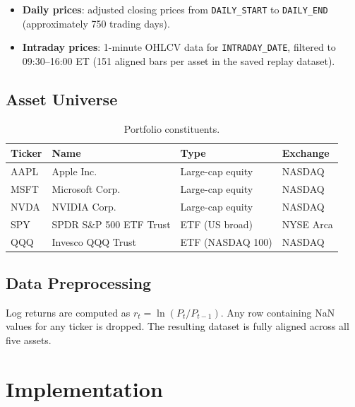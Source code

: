 \documentclass[12pt, a4paper]{article}
\begin{document}
\begin{itemize}
  \item \textbf{Daily prices}: adjusted closing prices from
        \texttt{DAILY\_START} to \texttt{DAILY\_END}
        (approximately 750 trading days).
  \item \textbf{Intraday prices}: 1-minute OHLCV data for
        \texttt{INTRADAY\_DATE}, filtered to 09:30–16:00 ET
        (151 aligned bars per asset in the saved replay dataset).
\end{itemize}

\subsection{Asset Universe}

\begin{table}[H]
  \centering
  \caption{Portfolio constituents.}
  \label{tab:assets}
  \begin{tabular}{llll}
    \toprule
    Ticker & Name & Type & Exchange \\
    \midrule
    AAPL   & Apple Inc.                 & Large-cap equity & NASDAQ \\
    MSFT   & Microsoft Corp.            & Large-cap equity & NASDAQ \\
    NVDA   & NVIDIA Corp.               & Large-cap equity & NASDAQ \\
    SPY    & SPDR S\&P 500 ETF Trust    & ETF (US broad)   & NYSE Arca \\
    QQQ    & Invesco QQQ Trust          & ETF (NASDAQ 100) & NASDAQ \\
    \bottomrule
  \end{tabular}
\end{table}

\subsection{Data Preprocessing}

Log returns are computed as $r_t = \ln(P_t / P_{t-1})$.  Any row
containing NaN values for any ticker is dropped.  The resulting dataset
is fully aligned across all five assets.

\section{Implementation}
\label{sec:implementation}
\end{document}
